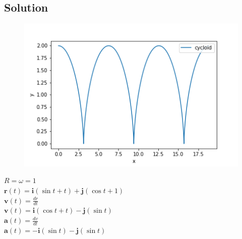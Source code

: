 \documentclass{article}
\begin{document}
    
    \subsection*{Solution}
    
    \begin{centering}
    
    \begin{figure}[h]
    	\centering
    	\includegraphics[height=0.4\textheight]{cycloid}
    \end{figure}
    
    
    $R = \omega = 1$ \\
    $\mathbf{r}(t) = \mathbf{i}(\sin{t} + t) + \mathbf{j}(\cos{t} + 1)$ \\
    $\mathbf{v}(t) = \frac{dr}{dt}$ \\
    $\mathbf{v}(t) = \mathbf{i}(\cos{t} + t) - \mathbf{j}(\sin{t})$ \\
    $\mathbf{a}(t) = \frac{dv}{dt}$ \\
    $\mathbf{a}(t) = - \mathbf{i}(\sin{t}) - \mathbf{j}(\sin{t})$ \\
     \\
    
    
    
    \end{centering}
    
    
    
    \pagebreak
    
\end{document}
